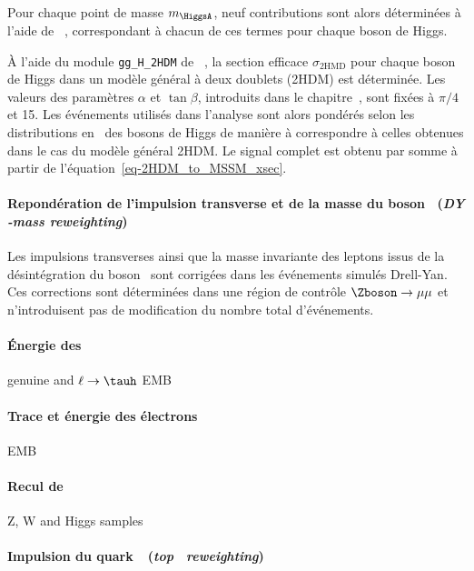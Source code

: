 Pour chaque point de masse $m_{\HiggsA}$, neuf contributions sont alors déterminées à l'aide de \POWHEG~\cite{Alioli:2010xd},
correspondant à chacun de ces termes pour chaque boson de Higgs.
\par
À l'aide du module \texttt{gg\_H\_2HDM} de \POWHEG~\cite{Alioli:2010xd}, la section efficace $\sigma_\text{2HMD}$ pour chaque boson de Higgs dans un modèle général à deux doublets (2HDM) est déterminée.
Les valeurs des paramètres $\alpha$ et $\tan\beta$, introduits dans le chapitre~, sont fixées à $\pi/4$ et 15.
Les événements utilisés dans l'analyse sont alors pondérés selon les distributions en \pT\ des bosons de Higgs de manière à correspondre à celles obtenues dans le cas du modèle général 2HDM.
Le signal complet est obtenu par somme à partir de l'équation~\eqref{eq-2HDM_to_MSSM_xsec}.
\paragraph{Repondération de l'impulsion transverse et de la masse du boson \Zboson\ (\emph{DY \pT-mass reweighting})}
Les impulsions transverses ainsi que la masse invariante des leptons issus de la désintégration du boson \Zboson\ sont corrigées
dans les événements simulés Drell-Yan.
Ces corrections sont déterminées dans une région de contrôle $\Zboson\to\mu\mu$ et n'introduisent pas de modification du nombre total d'événements.



\paragraph{Énergie des \tauh} genuine and $\ell\to\tauh$ EMB

\paragraph{Trace et énergie des électrons} EMB

\paragraph{Recul de \MET} Z, W and Higgs samples


\paragraph{Impulsion du quark~\quarkt\ (\emph{top \pT\ reweighting})} \ttbar

%
%
%
%
%
%
%
%
%
%


